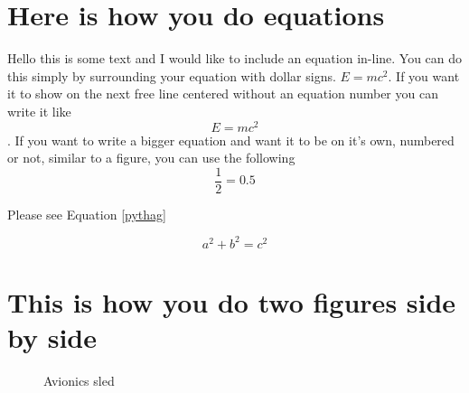 \section{Here is how you do equations}
Hello this is some text and I would like to include an equation in-line. You can do this simply by 
surrounding your equation with dollar signs. $E = mc^2$. If you want it to show on the next free line 
centered without an equation number you can write it like \[E = mc^2\]. If you want to write a bigger 
equation and want it to be on it's own, numbered or not, similar to a figure, you can use the following
\begin{equation}
    \frac{1}{2} = 0.5
\end{equation}


Please see Equation \ref{pythag} 

\begin{equation}
    \label{pythag}
    a^2 + b^2 = c^2
\end{equation}





\section{This is how you do two figures side by side}

\begin{figure}
    \centering
    \qquad
    \caption{Avionics sled}
    \label{avsled}
\end{figure}





